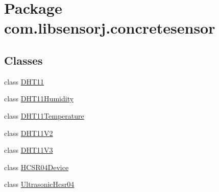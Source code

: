 \hypertarget{namespacecom_1_1libsensorj_1_1concretesensor}{}\section{Package com.\+libsensorj.\+concretesensor}
\label{namespacecom_1_1libsensorj_1_1concretesensor}
\subsection*{Classes}
\begin{DoxyCompactItemize}
\item 
class \hyperlink{classcom_1_1libsensorj_1_1concretesensor_1_1DHT11}{D\+H\+T11}
\item 
class \hyperlink{classcom_1_1libsensorj_1_1concretesensor_1_1DHT11Humidity}{D\+H\+T11\+Humidity}
\item 
class \hyperlink{classcom_1_1libsensorj_1_1concretesensor_1_1DHT11Temperature}{D\+H\+T11\+Temperature}
\item 
class \hyperlink{classcom_1_1libsensorj_1_1concretesensor_1_1DHT11V2}{D\+H\+T11\+V2}
\item 
class \hyperlink{classcom_1_1libsensorj_1_1concretesensor_1_1DHT11V3}{D\+H\+T11\+V3}
\item 
class \hyperlink{classcom_1_1libsensorj_1_1concretesensor_1_1HCSR04Device}{H\+C\+S\+R04\+Device}
\item 
class \hyperlink{classcom_1_1libsensorj_1_1concretesensor_1_1UltrasonicHcsr04}{Ultrasonic\+Hcsr04}
\end{DoxyCompactItemize}
